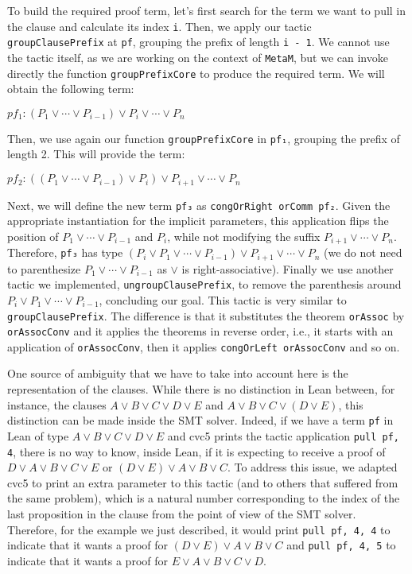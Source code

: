 To build the required proof term, let's first search for the term we want to pull in the clause and calculate its index \texttt{i}. Then, we apply our tactic \texttt{groupClausePrefix} at \texttt{pf}, grouping the prefix of length \texttt{i - 1}.
We cannot use the tactic itself, as we are working on the context of \texttt{MetaM}, but we can invoke directly the function \texttt{groupPrefixCore}
to produce the required term. We will obtain the following term:

\begin{center}
  $pf_{1} : (P_{1} \vee \cdots \vee P_{i - 1}) \vee P_{i} \vee \cdots \vee P_{n}$
\end{center}

Then, we use again our function \texttt{groupPrefixCore} in \texttt{pf₁}, grouping the prefix of length 2. This will provide the term:

\begin{center}
  $pf_{2} : ((P_{1} \vee \cdots \vee P_{i - 1}) \vee P_{i}) \vee P_{i + 1} \vee \cdots \vee P_{n}$
\end{center}

Next, we will define the new term \texttt{pf₃} as \texttt{congOrRight orComm pf₂}. Given the appropriate instantiation for the implicit parameters,
this application flips the position of $P_{1} \vee \cdots \vee P_{i - 1}$ and $P_{i}$, while not modifying the suffix $P_{i + 1} \vee \cdots \vee P_{n}$.
Therefore, \texttt{pf₃} has type $(P_{i} \vee P_{1} \vee \cdots \vee P_{i - 1}) \vee P_{i + 1} \vee \cdots \vee P_{n}$ (we do not need to parenthesize
$P_{1} \vee \cdots \vee P_{i - 1}$ as $\vee$ is right-associative). Finally we use another tactic we implemented, \texttt{ungroupClausePrefix},
to remove the parenthesis around $P_{i} \vee P_{1} \vee \cdots \vee P_{i - 1}$, concluding our goal.
This tactic is very similar to \texttt{groupClausePrefix}. The
difference is that it substitutes the theorem \texttt{orAssoc} by \texttt{orAssocConv} and it applies the theorems in reverse order, i.e., it
starts with an application of \texttt{orAssocConv}, then it applies \texttt{congOrLeft orAssocConv} and so on.

One source of ambiguity that we have to take into account here is the representation of the clauses.
While there is no distinction in Lean between, for instance, the clauses $A \vee B \vee C \vee D \vee E$
and $A \vee B \vee C \vee (D \vee E)$, this distinction can be made inside the SMT solver. Indeed, if
we have a term \texttt{pf} in Lean of type $A \vee B \vee C \vee D \vee E$ and cvc5 prints the tactic
application \texttt{pull pf, 4}, there is no way to know, inside Lean, if it is expecting to receive
a proof of $D \vee A \vee B \vee C \vee E$ or $(D \vee E) \vee A \vee B \vee C$. To address this issue,
we adapted cvc5 to print an extra parameter to this tactic (and to others that suffered from the same problem),
which is a natural number corresponding to the index of the last proposition in the clause from the
point of view of the SMT solver. Therefore, for the example we just described, it would print
\texttt{pull pf, 4, 4} to indicate that it wants a proof for $(D \vee E) \vee A \vee B \vee C$ and
\texttt{pull pf, 4, 5} to indicate that it wants a proof for $E \vee A \vee B \vee C \vee D$.

